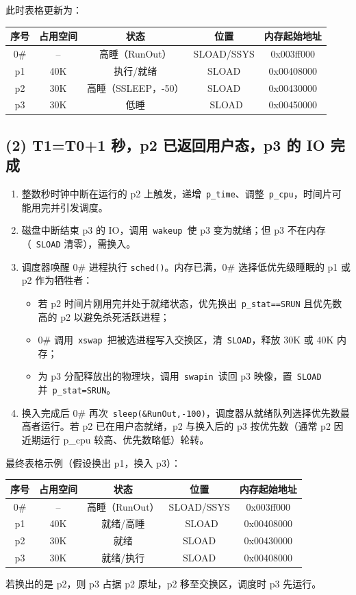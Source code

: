 \documentclass[11pt]{article}
\begin{document}
此时表格更新为：

\begin{longtable}{c|c|c|c|c}
\toprule
序号 & 占用空间 & 状态 & 位置 & 内存起始地址\\\midrule
0\# & -- & 高睡（RunOut） & SLOAD/SSYS & 0x003ff000\\
p1 & 40K & 执行/就绪 & SLOAD & 0x00408000\\
p2 & 30K & 高睡（SSLEEP，-50） & SLOAD & 0x00430000\\
p3 & 30K & 低睡 & ~SLOAD & 0x00450000\\
\bottomrule
\end{longtable}

\subsection*{(2) T1=T0+1 秒，p2 已返回用户态，p3 的 IO 完成}
\begin{enumerate}
  \item 整数秒时钟中断在运行的 p2 上触发，递增~\verb|p_time|、调整~\verb|p_cpu|，时间片可能用完并引发调度。
  \item 磁盘中断结束 p3 的 IO，调用~\verb|wakeup|~使 p3 变为就绪；但 p3 不在内存（~\verb|SLOAD| 清零），需换入。
  \item 调度器唤醒 0# 进程执行 \verb|sched()|。内存已满，0# 选择低优先级睡眠的 p1 或 p2 作为牺牲者：
    \begin{itemize}
      \item 若 p2 时间片刚用完并处于就绪状态，优先换出~\verb|p_stat==SRUN| 且优先数高的 p2 以避免杀死活跃进程；
      \item 0# 调用~\verb|xswap|~把被选进程写入交换区，清~\verb|SLOAD|，释放 30K 或 40K 内存；
      \item 为 p3 分配释放出的物理块，调用~\verb|swapin|~读回 p3 映像，置~\verb|SLOAD| 并~\verb|p_stat=SRUN|。
    \end{itemize}
  \item 换入完成后 0# 再次~\verb|sleep(&RunOut,-100)|，调度器从就绪队列选择优先数最高者运行。若 p2 已在用户态就绪，p2 与换入后的 p3 按优先数（通常 p2 因近期运行 p\_cpu 较高、优先数略低）轮转。
\end{enumerate}

最终表格示例（假设换出 p1，换入 p3）：

\begin{longtable}{c|c|c|c|c}
\toprule
序号 & 占用空间 & 状态 & 位置 & 内存起始地址\\\midrule
0\# & -- & 高睡（RunOut） & SLOAD/SSYS & 0x003ff000\\
p1 & 40K & 就绪/高睡 & ~SLOAD & 0x00408000\\
p2 & 30K & 就绪 & SLOAD & 0x00430000\\
p3 & 30K & 就绪/执行 & SLOAD & 0x00408000\\
\bottomrule
\end{longtable}

若换出的是 p2，则 p3 占据 p2 原址，p2 移至交换区，调度时 p3 先运行。
\end{document}

